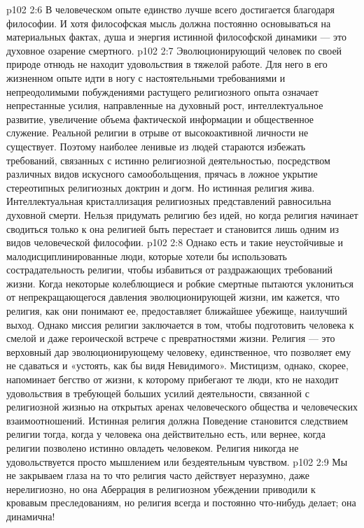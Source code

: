 \vs p102 2:6 В человеческом опыте единство лучше всего достигается благодаря философии. И хотя философская мысль должна постоянно основываться на материальных фактах, душа и энергия истинной философской динамики --- это духовное озарение смертного.
\vs p102 2:7 \pc Эволюционирующий человек по своей природе отнюдь не находит удовольствия в тяжелой работе. Для него в его жизненном опыте идти в ногу с настоятельными требованиями и непреодолимыми побуждениями растущего религиозного опыта означает непрестанные усилия, направленные на духовный рост, интеллектуальное развитие, увеличение объема фактической информации и общественное служение. Реальной религии в отрыве от высокоактивной личности не существует. Поэтому наиболее ленивые из людей стараются избежать требований, связанных с истинно религиозной деятельностью, посредством различных видов искусного самообольщения, прячась в ложное укрытие стереотипных религиозных доктрин и догм. Но истинная религия жива. Интеллектуальная кристаллизация религиозных представлений равносильна духовной смерти. Нельзя придумать религию без идей, но когда религия начинает сводиться только к  она религией быть перестает и становится лишь одним из видов человеческой философии.
\vs p102 2:8 Однако есть и такие неустойчивые и малодисциплинированные люди, которые хотели бы использовать сострадательность религии, чтобы избавиться от раздражающих требований жизни. Когда некоторые колеблющиеся и робкие смертные пытаются уклониться от непрекращающегося давления эволюционирующей жизни, им кажется, что религия, как они понимают ее, предоставляет ближайшее убежище, наилучший выход. Однако миссия религии заключается в том, чтобы подготовить человека к смелой и даже героической встрече с превратностями жизни. Религия --- это верховный дар эволюционирующему человеку, единственное, что позволяет ему не сдаваться и «устоять, как бы видя Невидимого». Мистицизм, однако, скорее, напоминает бегство от жизни, к которому прибегают те люди, кто не находит удовольствия в требующей больших усилий деятельности, связанной с религиозной жизнью на открытых аренах человеческого общества и человеческих взаимоотношений. Истинная религия должна  Поведение становится следствием религии тогда, когда у человека она действительно есть, или вернее, когда религии позволено истинно овладеть человеком. Религия никогда не удовольствуется просто мышлением или бездеятельным чувством.
\vs p102 2:9 Мы не закрываем глаза на то что религия часто действует неразумно, даже нерелигиозно, но она  Аберрация в религиозном убеждении приводили к кровавым преследованиям, но религия всегда и постоянно что\hyp{}нибудь делает; она динамична!
